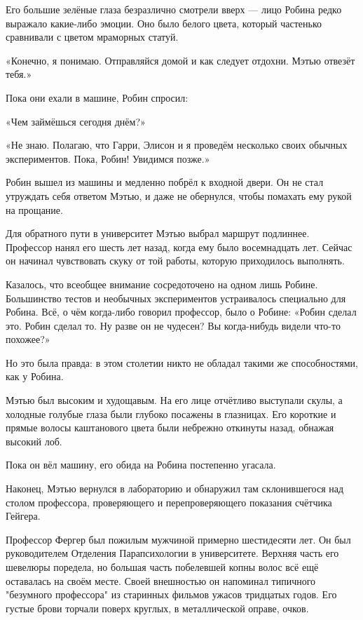 \documentclass[a4paper,12pt]{book}
\begin{document}
\par
Его большие зелёные глаза безразлично смотрели вверх — лицо Робина редко выражало какие-либо эмоции. Оно было белого цвета, который частенько сравнивали с цветом мраморных статуй.
\par
«Конечно, я понимаю. Отправляйся домой и как следует отдохни. Мэтью отвезёт тебя.»\\
\par
Пока они ехали в машине, Робин спросил:
\par
«Чем займёшься сегодня днём?»
\par
«Не знаю. Полагаю, что Гарри, Элисон и я проведём несколько своих обычных экспериментов. Пока, Робин! Увидимся позже.»
\par
Робин вышел из машины и медленно побрёл к входной двери. Он не стал утруждать себя ответом Мэтью, и даже не обернулся, чтобы помахать ему рукой на прощание.\\
\par
Для обратного пути в университет Мэтью выбрал маршрут подлиннее. Профессор нанял его шесть лет назад, когда ему было восемнадцать лет. Сейчас он начинал чувствовать скуку от той работы, которую приходилось выполнять.
\par
Казалось, что всеобщее внимание сосредоточено на одном лишь Робине. Большинство тестов и необычных экспериментов устраивалось специально для Робина. Всё, о чём когда-либо говорил профессор, было о Робине: «Робин сделал это. Робин сделал то. Ну разве он не чудесен? Вы когда-нибудь видели что-то похожее?»
\par
Но это была правда: в этом столетии никто не обладал такими же способностями, как у Робина.\\
\par
Мэтью был высоким и худощавым. На его лице отчётливо выступали скулы, а холодные голубые глаза были глубоко посажены в глазницах. Его короткие и прямые волосы каштанового цвета были небрежно откинуты назад, обнажая высокий лоб.
\par
Пока он вёл машину, его обида на Робина постепенно угасала.\\
\par
Наконец, Мэтью вернулся в лабораторию и обнаружил там склонившегося над столом профессора, проверяющего и перепроверяющего показания счётчика Гейгера.
\par
Профессор Фергер был пожилым мужчиной примерно шестидесяти лет. Он был руководителем Отделения Парапсихологии в университете. Верхняя часть его шевелюры поредела, но большая часть побелевшей копны волос всё ещё оставалась на своём месте. Своей внешностью он напоминал типичного "безумного профессора" из старинных фильмов ужасов тридцатых годов. Его густые брови торчали поверх круглых, в металлической оправе, очков.
\end{document}
